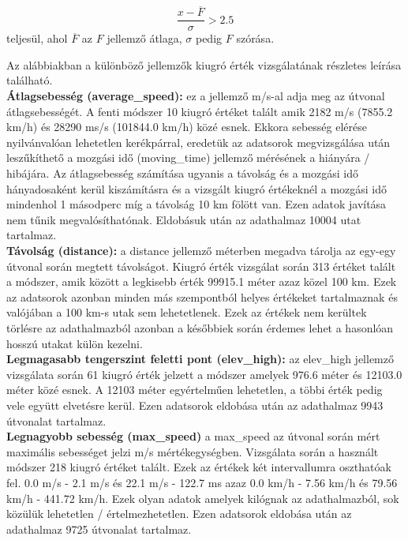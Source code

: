 \[  \frac{x - \overline{F}}{\sigma} > 2.5\]
teljesül, ahol $\overline{F}$ az $F$ jellemző átlaga, $\sigma$ pedig $F$ szórása.

Az alábbiakban a különböző jellemzők kiugró érték vizsgálatának részletes leírása található.\\[6pt]

\textbf{Átlagsebesség (average\_speed):}
ez a jellemző m/s-al adja meg az útvonal átlagsebességét. A fenti módszer 10 kiugró értéket talált amik 2182 m/s (7855.2 km/h) és 28290 ms/s (101844.0 km/h) közé esnek. Ekkora sebesség elérése nyilvánvalóan lehetetlen kerékpárral, eredetük az adatsorok megvizsgálása után leszűkíthető a mozgási idő (moving\_time) jellemző mérésének a hiányára / hibájára. Az átlagsebesség számítása ugyanis a távolság és a mozgási idő hányadosaként kerül kiszámításra és a vizsgált kiugró értékeknél a mozgási idő mindenhol 1 másodperc míg a távolság 10 km fölött van. Ezen adatok javítása nem tűnik megvalósíthatónak. Eldobásuk után az adathalmaz 10004 utat tartalmaz.\\[6pt]

\textbf{Távolság (distance):}
a distance jellemző méterben megadva tárolja az egy-egy útvonal során megtett távolságot. Kiugró érték vizsgálat során 313 értéket talált a módszer, amik között a legkisebb érték 99915.1 méter azaz közel 100 km. Ezek az adatsorok azonban minden más szempontból helyes értékeket tartalmaznak és valójában a 100 km-s utak sem lehetetlenek. Ezek az értékek nem kerültek törlésre az adathalmazból azonban a későbbiek során érdemes lehet a hasonlóan hosszú utakat külön kezelni.\\[6pt]

\textbf{Legmagasabb tengerszint feletti pont (elev\_high):}
az elev\_high jellemző vizsgálata során 61 kiugró érték jelzett a módszer amelyek 976.6 méter és 12103.0 méter közé esnek. A 12103 méter egyértelműen lehetetlen, a többi érték pedig vele együtt elvetésre kerül. Ezen adatsorok eldobása után az adathalmaz 9943 útvonalat tartalmaz.\\[6pt]

\textbf{Legnagyobb sebesség (max\_speed)}
a max\_speed az útvonal során mért maximális sebességet jelzi m/s mértékegységben. Vizsgálata során a használt módszer 218 kiugró értéket talált. Ezek az értékek két intervallumra oszthatóak fel. 0.0 m/s - 2.1 m/s és 22.1 m/s - 122.7 ms azaz 0.0 km/h - 7.56 km/h és 79.56 km/h - 441.72 km/h. Ezek olyan adatok amelyek kilógnak az adathalmazból, sok közülük lehetetlen / értelmezhetetlen. Ezen adatsorok eldobása után az adathalmaz 9725 útvonalat tartalmaz.\\[6pt]


